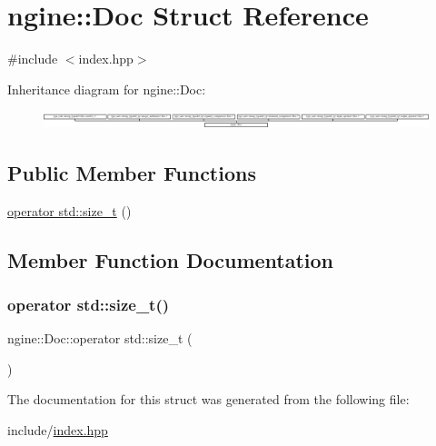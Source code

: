 \hypertarget{structngine_1_1Doc}{}\section{ngine\+:\+:Doc Struct Reference}
\label{structngine_1_1Doc}


{\ttfamily \#include $<$index.\+hpp$>$}

Inheritance diagram for ngine\+:\+:Doc\+:\begin{figure}[H]
\begin{center}
\leavevmode
\includegraphics[height=0.514233cm]{structngine_1_1Doc}
\end{center}
\end{figure}
\subsection*{Public Member Functions}
\begin{DoxyCompactItemize}
\item 
\hyperlink{structngine_1_1Doc_a7833ccf2371544b845347c1f2ce51663}{operator std\+::size\+\_\+t} ()
\end{DoxyCompactItemize}


\subsection{Member Function Documentation}
\mbox{\label{structngine_1_1Doc_a7833ccf2371544b845347c1f2ce51663}} 
\subsubsection{\texorpdfstring{operator std\+::size\+\_\+t()}{operator std::size\_t()}}
{\footnotesize\ttfamily ngine\+::\+Doc\+::operator std\+::size\+\_\+t (\begin{DoxyParamCaption}{ }\end{DoxyParamCaption})\hspace{0.3cm}{\ttfamily [inline]}}



The documentation for this struct was generated from the following file\+:\begin{DoxyCompactItemize}
\item 
include/\hyperlink{index_8hpp}{index.\+hpp}\end{DoxyCompactItemize}
